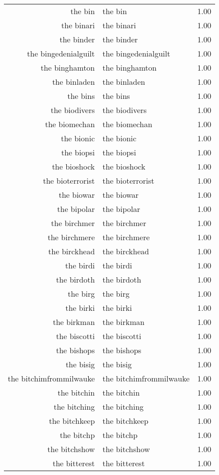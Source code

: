 \begin{table}[ht]
\begin{tabular}{rlr}
  the bin & the bin & 1.00 \\ 
  the binari & the binari & 1.00 \\ 
  the binder & the binder & 1.00 \\ 
  the bingedenialguilt & the bingedenialguilt & 1.00 \\ 
  the binghamton & the binghamton & 1.00 \\ 
  the binladen & the binladen & 1.00 \\ 
  the bins & the bins & 1.00 \\ 
  the biodivers & the biodivers & 1.00 \\ 
  the biomechan & the biomechan & 1.00 \\ 
  the bionic & the bionic & 1.00 \\ 
  the biopsi & the biopsi & 1.00 \\ 
  the bioshock & the bioshock & 1.00 \\ 
  the bioterrorist & the bioterrorist & 1.00 \\ 
  the biowar & the biowar & 1.00 \\ 
  the bipolar & the bipolar & 1.00 \\ 
  the birchmer & the birchmer & 1.00 \\ 
  the birchmere & the birchmere & 1.00 \\ 
  the birckhead & the birckhead & 1.00 \\ 
  the birdi & the birdi & 1.00 \\ 
  the birdoth & the birdoth & 1.00 \\ 
  the birg & the birg & 1.00 \\ 
  the birki & the birki & 1.00 \\ 
  the birkman & the birkman & 1.00 \\ 
  the biscotti & the biscotti & 1.00 \\ 
  the bishops & the bishops & 1.00 \\ 
  the bisig & the bisig & 1.00 \\ 
  the bitchimfrommilwauke & the bitchimfrommilwauke & 1.00 \\ 
  the bitchin & the bitchin & 1.00 \\ 
  the bitching & the bitching & 1.00 \\ 
  the bitchkeep & the bitchkeep & 1.00 \\ 
  the bitchp & the bitchp & 1.00 \\ 
  the bitchshow & the bitchshow & 1.00 \\ 
  the bitterest & the bitterest & 1.00 \\ 

\end{tabular}
\end{table}
